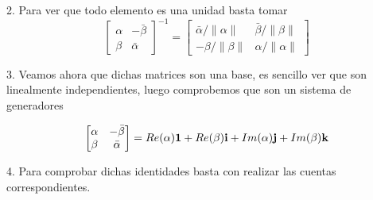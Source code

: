 2. Para ver que todo elemento es una unidad basta tomar
\[
   \begin{bmatrix}
    \alpha       &  -\bar{\beta} \\
    \beta       &  \bar{\alpha}
  \end{bmatrix} ^{-1} =
   \begin{bmatrix}
    \bar{\alpha}/\|\alpha\|       &  \bar{\beta}/\|\beta\| \\
    -\beta/\|\beta\|       &  \alpha / \|\alpha\|
\end{bmatrix}
\]

3. Veamos ahora que dichas matrices son una base, es sencillo ver que son
linealmente independientes, luego comprobemos que son un sistema de generadores

\[
   \begin{bmatrix}
    \alpha       &  -\bar{\beta} \\
    \beta       &  \bar{\alpha}
  \end{bmatrix}  = Re(\alpha)\text{\textbf{1}} + Re(\beta)\text{\textbf{i}} + Im(\alpha)\text{\textbf{j}} + Im(\beta)\text{\textbf{k}}
\]

4. Para comprobar dichas identidades basta con realizar las cuentas correspondientes.

